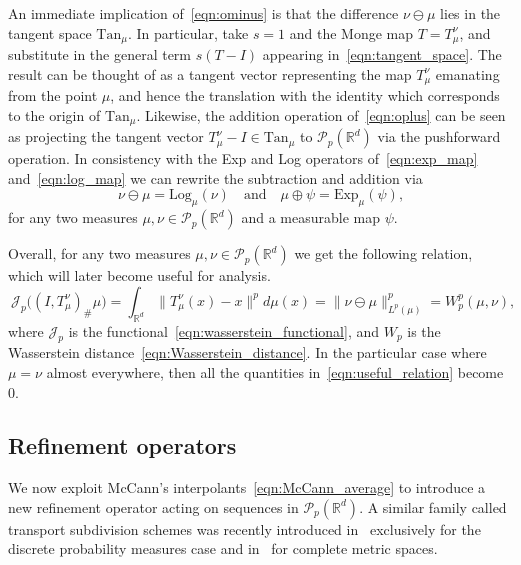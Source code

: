 \documentclass[12pt]{amsart}
\begin{document}
An immediate implication of~\eqref{eqn:ominus} is that the difference $\nu\ominus\mu$ lies in the tangent space $\text{Tan}_\mu$. In particular, take $s=1$ and the Monge map $T=T_\mu^\nu$, and substitute in the general term $s(T-I)$ appearing in~\eqref{eqn:tangent_space}. The result can be thought of as a tangent vector representing the map $T_\mu^\nu$ emanating from the point $\mu$, and hence the translation with the identity which corresponds to the origin of $\text{Tan}_\mu$. Likewise, the addition operation of~\eqref{eqn:oplus} can be seen as projecting the tangent vector $T_\mu^\nu-I\in\text{Tan}_\mu$ to $\mathcal{P}_p(\mathbb{R}^d)$ via the pushforward operation. In consistency with the Exp and Log operators of~\eqref{eqn:exp_map} and~\eqref{eqn:log_map} we can rewrite the subtraction and addition via
\begin{equation}~\label{eqn:operators_exp_log}
    \nu\ominus\mu = \text{Log}_\mu(\nu) \quad \text{and} \quad \mu\oplus \psi = \text{Exp}_\mu(\psi),
\end{equation}
for any two measures $\mu,\nu\in\mathcal{P}_p(\mathbb{R}^d)$ and a measurable map $\psi$.

Overall, for any two measures $\mu,\nu\in\mathcal{P}_p(\mathbb{R}^d)$ we get the following relation, which will later become useful for analysis.
\begin{equation}~\label{eqn:useful_relation}
    \mathcal{J}_p\big((I,T_{\mu}^\nu)_{\#}\mu\big) = \int_{\mathbb{R}^d}\|T_\mu^\nu(x) - x\|^p d\mu(x) = \|\nu \ominus \mu\|^p_{L^p(\mu)} = W_p^p(\mu, \nu),
\end{equation}
where $\mathcal{J}_p$ is the functional~\eqref{eqn:wasserstein_functional}, and $W_p$ is the Wasserstein distance~\eqref{eqn:Wasserstein_distance}. In the particular case where $\mu=\nu$ almost everywhere, then all the quantities in~\eqref{eqn:useful_relation} become $0$.

\subsection{Refinement operators}

We now exploit McCann's interpolants~\eqref{eqn:McCann_average} to introduce a new refinement operator acting on sequences in $\mathcal{P}_p(\mathbb{R}^d)$. A similar family called transport subdivision schemes was recently introduced in~\cite{baccou2024subdivision} exclusively for the discrete probability measures case and in~\cite{DynSharon2025} for complete metric spaces.
\end{document}
